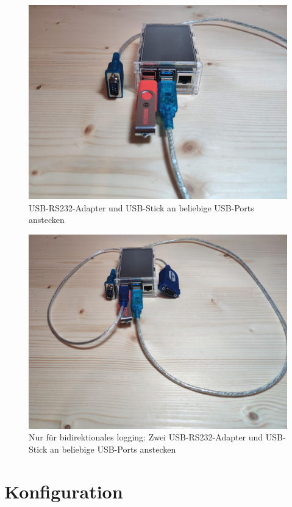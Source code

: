 \documentclass{article}
\begin{document}
\begin{figure}
  \caption{USB-RS232-Adapter und USB-Stick an beliebige USB-Ports anstecken}
  \centering
    \includegraphics[width=1\textwidth]{hardware3.jpg}
\end{figure}
\begin{figure}
  \caption{Nur für bidirektionales logging: Zwei USB-RS232-Adapter und USB-Stick an beliebige USB-Ports anstecken}
  \centering
    \includegraphics[width=1\textwidth]{hardware5.jpg}
\end{figure}
\section{Konfiguration}
\end{document}
